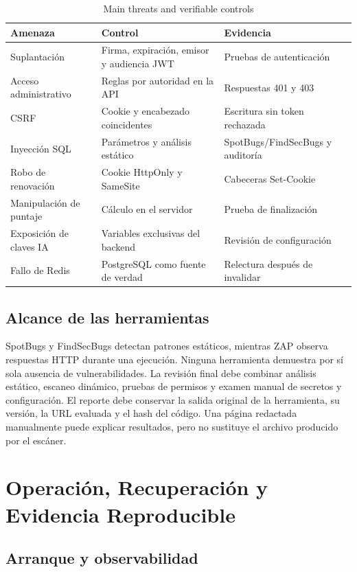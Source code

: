 \documentclass[11pt,a4paper]{report}
\begin{document}
\begin{table}[htbp]
\centering
\caption{Main threats and verifiable controls}
\begin{tabularx}{\textwidth}{p{3.2cm}X X}
\toprule
\textbf{Amenaza} & \textbf{Control} & \textbf{Evidencia} \\
\midrule
Suplantación & Firma, expiración, emisor y audiencia JWT & Pruebas de autenticación \\
Acceso administrativo & Reglas por autoridad en la API & Respuestas 401 y 403 \\
CSRF & Cookie y encabezado coincidentes & Escritura sin token rechazada \\
Inyección SQL & Parámetros y análisis estático & SpotBugs/FindSecBugs y auditoría \\
Robo de renovación & Cookie HttpOnly y SameSite & Cabeceras Set-Cookie \\
Manipulación de puntaje & Cálculo en el servidor & Prueba de finalización \\
Exposición de claves IA & Variables exclusivas del backend & Revisión de configuración \\
Fallo de Redis & PostgreSQL como fuente de verdad & Relectura después de invalidar \\
\bottomrule
\end{tabularx}
\end{table}

\section{Alcance de las herramientas}

SpotBugs y FindSecBugs detectan patrones estáticos, mientras ZAP observa respuestas
HTTP durante una ejecución. Ninguna herramienta demuestra por sí sola ausencia de
vulnerabilidades. La revisión final debe combinar análisis estático, escaneo dinámico,
pruebas de permisos y examen manual de secretos y configuración. El reporte debe
conservar la salida original de la herramienta, su versión, la URL evaluada y el hash
del código. Una página redactada manualmente puede explicar resultados, pero no
sustituye el archivo producido por el escáner.

\chapter{Operación, Recuperación y Evidencia Reproducible}
\label{anexo:operacion}

\section{Arranque y observabilidad}
\end{document}
